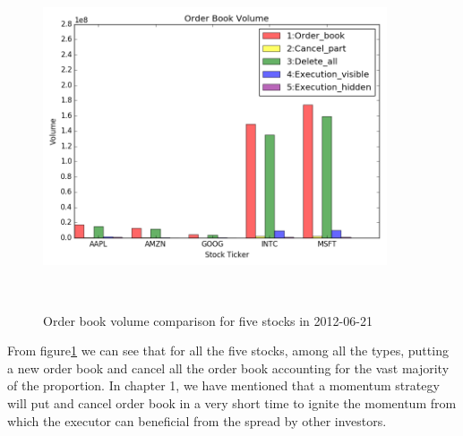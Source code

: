 \begin{figure}[hbtp]
  \begin{center}
    \includegraphics[width=4in,height=4in]{figures/order_book_volume.png}
  \end{center}
\caption{Order book volume comparison for five stocks in 2012-06-21} \label{fig:order_book_volume}
\end{figure}

From figure\ref{fig:order_book_volume} we can see that for all the five stocks, among all the types, putting a new order book and cancel all the order book accounting for the vast majority of the proportion. In chapter 1, we have mentioned that a momentum strategy will put and cancel order book in a very short time to ignite the momentum from which the executor can beneficial from the spread by other investors. 


